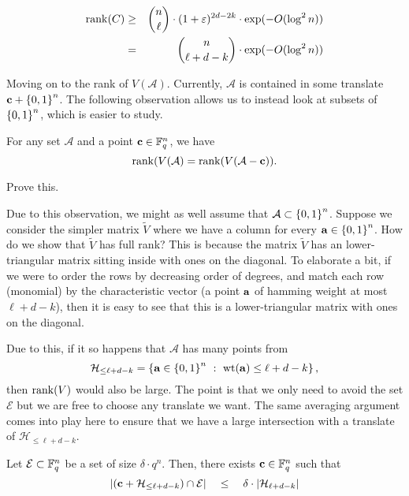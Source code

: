 \begin{eqnarray}
\operatorname{rank}(C) & \geq & \binom{n}{\ell} \cdot (1 + \varepsilon)^{2d-2k} \cdot \exp(-O(\log^2 n))\nonumber\\
 & = & \binom{n}{\ell + d - k} \cdot \exp(-O(\log^2 n))\label{eqn:rank-C-lower-bound}
\end{eqnarray}

Moving on to the rank of $V(\mathcal{A})$. Currently, $\mathcal{A}$ is contained in some translate $\mathbf{c} + \left\{0,1\right\}^n$. The following observation allows us to instead look at subsets of $\left\{0,1\right\}^n$, which is easier to study. 

\begin{observation} For any set $\mathcal{A}$ and a point $\mathbf{c} \in \mathbb{F}_q^n$, we have 
\[
\operatorname{rank}(V(\mathcal{A}) = \operatorname{rank}(V(\mathcal{A} - \mathbf{c})). 
\]
\end{observation}
\begin{exercise}
Prove this. 
\end{exercise}

Due to this observation, we might as well assume that $\mathcal{A} \subset \left\{0,1\right\}^n$. 
Suppose we consider the simpler matrix $\tilde{V}$ where we have a column for every $\mathbf{a} \in \left\{0,1\right\}^n$.
How do we show that $\tilde{V}$ has full rank?
This is because the matrix $\tilde{V}$ has an lower-triangular matrix sitting inside with ones on the diagonal.
To elaborate a bit, if we were to order the rows by decreasing order of degrees, and match each row (monomial) by the characteristic vector (a point $\mathbf{a}$ of hamming weight at most $\ell + d - k$), then it is easy to see that this is a lower-triangular matrix with ones on the diagonal.

Due to this, if it so happens that $\mathcal{A}$ has many points from 
\[\mathcal{H}_{\leq \ell+ d - k} = \left\{{\mathbf{a} \in \left\{0,1\right\}^n}\ : \ {\mathrm{wt}(\mathbf{a}) \leq \ell + d - k}\right\},\]
then $\operatorname{rank}(V)$ would also be large. The point is that we only need to avoid the set $\mathcal{E}$ but we are free to choose any translate we want. The same averaging argument comes into play here to ensure that we have a large intersection with a translate of $\mathcal{H}_{\leq \ell+ d - k}$. 
\begin{lemma}
Let $\mathcal{E} \subset \mathbb{F}_q^n$ be a set of size $\delta \cdot q^n$. Then, there exists $\mathbf{c} \in \mathbb{F}_q^n$ such that 
\[
\left|(\mathbf{c} + \mathcal{H}_{\leq \ell+ d - k}) \cap \mathcal{E}\right| \quad \leq \quad \delta \cdot \left|\mathcal{H}_{\ell + d - k}\right|
\]
\end{lemma}

